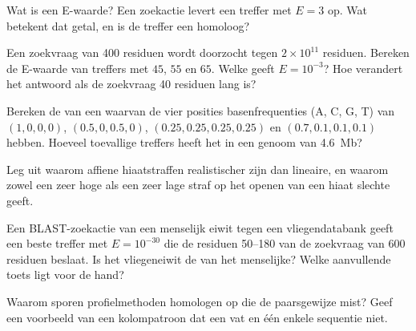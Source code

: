 \begin{exercise}[$\star$]\label{exo:b3:bioinformatics:4}
Wat is een E-waarde? Een zoekactie levert een treffer met $E = 3$ op.
Wat betekent dat getal, en is de treffer een homoloog?
\end{exercise}

\begin{exercise}[$\star\star$]\label{exo:b3:bioinformatics:5}
Een zoekvraag van \num{400} residuen wordt doorzocht tegen
$2\times 10^{11}$ residuen. Bereken de E-waarde van treffers met
 $45$, $55$ en $65$. Welke  geeft $E = 10^{-3}$? Hoe
verandert het antwoord als de zoekvraag \num{40} residuen lang is?
\end{exercise}

\begin{exercise}[$\star\star$]\label{exo:b3:bioinformatics:6}
Bereken de  van een  waarvan de vier posities
basenfrequenties (A, C, G, T) van $(1,0,0,0)$, $(0.5,0,0.5,0)$,
$(0.25,0.25,0.25,0.25)$ en $(0.7,0.1,0.1,0.1)$ hebben. Hoeveel
toevallige treffers heeft het in een genoom van \qty{4.6}{Mb}?
\end{exercise}

\begin{exercise}[$\star\star$]\label{exo:b3:bioinformatics:7}
Leg uit waarom affiene hiaatstraffen realistischer zijn dan lineaire,
en waarom zowel een zeer hoge als een zeer lage straf op het openen van
een hiaat slechte  geeft.
\end{exercise}

\begin{exercise}[$\star\star$]\label{exo:b3:bioinformatics:8}
Een BLAST-zoekactie van een menselijk eiwit tegen een vliegendatabank
geeft een beste treffer met $E = 10^{-30}$ die de residuen 50--180 van
de zoekvraag van \num{600} residuen beslaat. Is het vliegeneiwit de
 van het menselijke? Welke aanvullende toets ligt voor de
hand?
\end{exercise}

\begin{exercise}[$\star\star$]\label{exo:b3:bioinformatics:9}
Waarom sporen profielmethoden homologen op die de paarsgewijze
 mist? Geef een voorbeeld van een kolompatroon dat een
 vat en één enkele sequentie niet.
\end{exercise}

